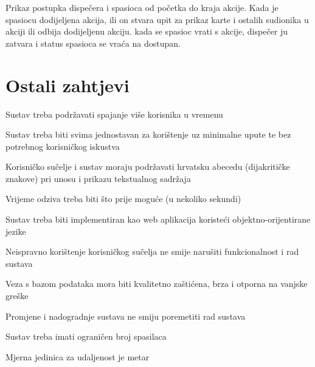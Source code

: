 				Prikaz postupka dispečera i spasioca od početka do kraja akcije. Kada je spasiocu dodijeljena akcija, ili on stvara upit za prikaz karte i ostalih sudionika u akciji ili odbija dodijeljenu akciju. kada se spasioc vrati s akcije, dispečer ju zatvara i status spasioca se vraća na dostupan.
				
				\eject
	
		\section{Ostali zahtjevi}
		
			
			\begin{packed_item}
			\item  Sustav treba podržavati spajanje više korisnika u vremenu
			\item  Sustav treba biti svima jednostavan za korištenje uz minimalne upute te bez potrebnog korisničkog iskustva
			\item  Korisničko sučelje i sustav moraju podržavati hrvatsku abecedu (dijakritičke znakove) pri unosu i prikazu tekstualnog sadržaja
			\item  Vrijeme odziva treba biti što prije moguće (u nekoliko sekundi)
			\item  Sustav treba biti implementiran kao web aplikacija koristeći objektno-orijentirane jezike
			\item  Neispravno korištenje korisničkog sučelja ne smije narušiti funkcionalnost i rad sustava
			\item  Veza s bazom podataka mora biti kvalitetno zaštićena, brza i otporna na vanjske greške
			\item  Promjene i nadogradnje sustava ne smiju poremetiti rad sustava
			\item  Sustav treba imati ograničen broj spasilaca
			\item  Mjerna jedinica za udaljenost je metar
			 \end{packed_item}
			 
			 
	